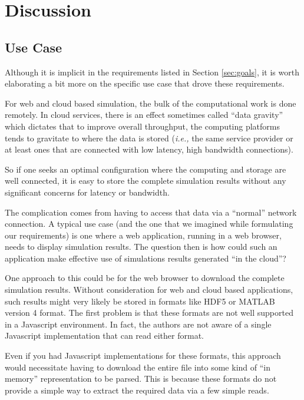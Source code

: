 \documentclass[11pt,a4paper,twocolumn]{article}
\begin{document}
\section{Discussion}
\label{sec:discussion}

\subsection{Use Case}

Although it is implicit in the requirements listed in Section
\ref{sec:goals}, it is worth elaborating a bit more on the specific
use case that drove these requirements.

For web and cloud based simulation, the bulk of the computational work
is done remotely.  In cloud services, there is an effect sometimes
called ``data gravity'' which dictates that to improve overall
throughput, the computing platforms tends to gravitate to where the
data is stored (\textit{i.e.,} the same service provider or at least
ones that are connected with low latency, high bandwidth connections).

So if one seeks an optimal configuration where the computing and
storage are well connected, it is easy to store the complete
simulation results without any significant concerns for latency or
bandwidth.

The complication comes from having to access that data via a
``normal'' network connection.  A typical use case (and the one that
we imagined while formulating our requirements) is one where a web
application, running in a web browser, needs to display simulation
results.  The question then is how could such an application make
effective use of simulations results generated ``in the cloud''?

One approach to this could be for the web browser to download the
complete simulation results.  Without consideration for web and cloud
based applications, such results might very likely be stored in
formats like HDF5 or MATLAB version 4 format.  The first problem is
that these formats are not well supported in a Javascript environment.
In fact, the authors are not aware of a single Javascript
implementation that can read either format.

Even if you had Javascript implementations for these formats, this
approach would necessitate having to download the entire file into
some kind of ``in memory'' representation to be parsed.  This is
because these formats do not provide a simple way to extract the
required data via a few simple reads.
\end{document}
